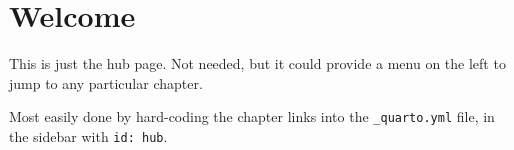 \documentclass[
  a4paper,
  DIV=11,
  numbers=noendperiod,
  oneside]{scrreport}
\author{}
\date{}
\begin{document}
\chapter{Welcome}\label{welcome}

This is just the hub page. Not needed, but it could provide a menu on
the left to jump to any particular chapter.

Most easily done by hard-coding the chapter links into the
\texttt{\_quarto.yml} file, in the sidebar with \texttt{id:\ hub}.
\end{document}
